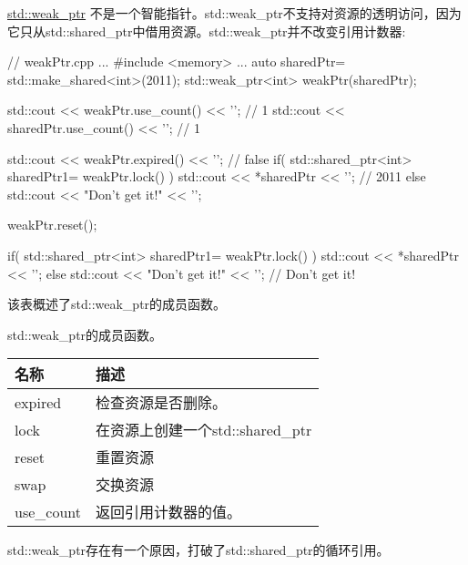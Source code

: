 \href{http://en.cppreference.com/w/cpp/memory/weak_ptr}{std::weak\_ptr} 不是一个智能指针。std::weak\_ptr不支持对资源的透明访问，因为它只从std::shared\_ptr中借用资源。std::weak\_ptr并不改变引用计数器:


\begin{cpp}
// weakPtr.cpp
...
#include <memory>
...
auto sharedPtr= std::make_shared<int>(2011);
std::weak_ptr<int> weakPtr(sharedPtr);

std::cout << weakPtr.use_count() << '\n'; // 1
std::cout << sharedPtr.use_count() << '\n'; // 1

std::cout << weakPtr.expired() << '\n'; // false
if( std::shared_ptr<int> sharedPtr1= weakPtr.lock() ) {
	std::cout << *sharedPtr << '\n'; // 2011
}
else{
	std::cout << "Don't get it!" << '\n';
}

weakPtr.reset();

if( std::shared_ptr<int> sharedPtr1= weakPtr.lock() ) {
	std::cout << *sharedPtr << '\n';
}
else{
	std::cout << "Don't get it!" << '\n'; // Don't get it!
}
\end{cpp}

该表概述了std::weak\_ptr的成员函数。

\begin{center}
std::weak\_ptr的成员函数。
\end{center}

\begin{longtable}[c]{|l|l|}
\hline
\textbf{名称} & \textbf{描述}                        \\ \hline
\endfirsthead
%
\endhead
%
expired       & 检查资源是否删除。         \\ \hline
lock          & 在资源上创建一个std::shared\_ptr  \\ \hline
reset         & 重置资源                         \\ \hline
swap          & 交换资源                          \\ \hline
use\_count    & 返回引用计数器的值。\\ \hline
\end{longtable}

std::weak\_ptr存在有一个原因，打破了std::shared\_ptr的循环引用。


